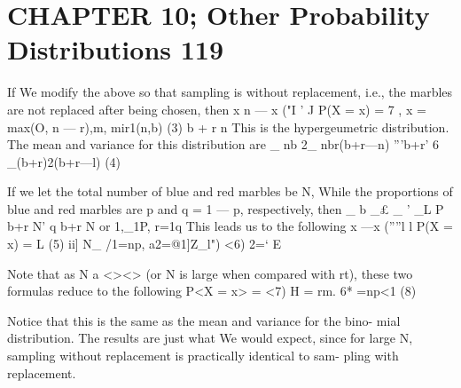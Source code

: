 \section{CHAPTER 10; Other Probability Distributions 119}
If We modify the above so that sampling is without replacement,
i.e., the marbles are not replaced after being chosen, then
x n — x
("I ' J
P(X = x) = 7 , x = max(O, n — r),m, mir1(n,b) (3)
b + r
n
This is the hypergeumetric distribution. 
The mean and variance for this distribution are
_ nb 2_ nbr(b+r—n)
”'b+r’ 6 _(b+r)2(b+r—l) (4)


If we let the total number of blue and red marbles be N, While the
proportions of blue and red marbles are p and q = 1 — p, respectively,
then
_ b _£ _ ' _L
P b+r N’ q b+r N or 1,_1\/P, r=1\/q
This leads us to the following
x —x
(””l l
P(X = x) = L (5)
ii]
N_
/1=np, a2=@1\‘]Z_l") <6)
2=‘
E


Note that as N a <><> (or N is large when compared with rt), these
two formulas reduce to the following
P<X = x> =  <7)
H = rm. 6* =np<1 (8)

Notice that this is the same as the mean and variance for the bino-
mial distribution. The results are just what We would expect, since for
large N, sampling without replacement is practically identical to sam-
pling with replacement.
